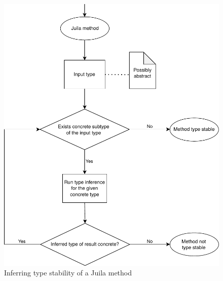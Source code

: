 \begin{figure}
  \includegraphics{figs/infer-ts.pdf}
  \caption{Inferring type stability of a Juila method}%
  \label{fig:infer-ts}
\end{figure}
